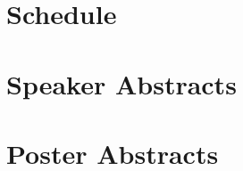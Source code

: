 \documentclass[a4paper,11pt,oneside]{book}%
\begin{document}
\frontmatter


\tableofcontents
\mainmatter
\pagestyle{MyStyle}
\renewcommand{\thesection}{\arabic{section}}

\chapter{Schedule}
\chapter{Speaker Abstracts}
\renewcommand{\thesection}{\arabic{section}}

\chapter{Poster Abstracts}
\renewcommand{\thesection}{\arabic{section}}

\end{document}
